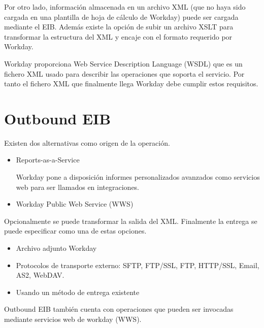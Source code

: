 Por otro lado, información almacenada en un archivo XML (que no haya sido cargada en una plantilla de hoja de cálculo de Workday) puede ser cargada mediante el EIB.
Además existe la opción de subir un archivo XSLT para transformar la estructura del XML y encaje con el formato requerido por Workday.

Workday proporciona Web Service Description Language (WSDL) que es un  fichero XML usado para describir las operaciones que soporta el servicio.
Por tanto el fichero XML que finalmente llega Workday debe cumplir estos requisitos.


\section{Outbound EIB}

Existen dos alternativas como origen de la operación.
\begin{itemize} 
\item Reports-as-a-Service

Workday pone a disposición informes personalizados avanzados como servicios web para ser llamados en integraciones.
\item Workday Public Web Service (WWS)

\end{itemize}
Opcionalmente se puede transformar la salida del XML.
Finalmente la entrega se puede especificar como una de estas opciones.
\begin{itemize}
\item Archivo adjunto Workday
\item Protocolos de transporte externo: SFTP, FTP/SSL, FTP,  HTTP/SSL, Email, AS2, WebDAV.
\item Usando un método de entrega existente
\end{itemize}
Outbound EIB también cuenta con operaciones que pueden ser invocadas mediante servicios web de workday (WWS).


